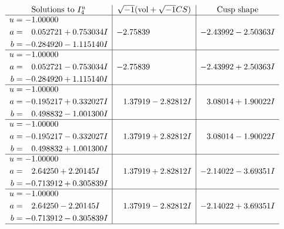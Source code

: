 \documentclass[1p]{elsarticle_modified}
\theoremstyle{definition}
\newcommand{\I}{\sqrt{-1}}
\begin{document}
$$\begin{array}{c|c|c}  
\text{Solutions to }I^u_{4}& \I (\text{vol} + \sqrt{-1}CS) & \text{Cusp shape}\\
 \hline 
\begin{aligned}
u &= -1.00000\phantom{ +0.000000I} \\
a &= \phantom{-}0.052721 + 0.753034 I \\
b &= -0.284920 - 1.115140 I\end{aligned}
 & -2.75839\phantom{ +0.000000I} & -2.43992 - 2.50363 I \\ \hline\begin{aligned}
u &= -1.00000\phantom{ +0.000000I} \\
a &= \phantom{-}0.052721 - 0.753034 I \\
b &= -0.284920 + 1.115140 I\end{aligned}
 & -2.75839\phantom{ +0.000000I} & -2.43992 + 2.50363 I \\ \hline\begin{aligned}
u &= -1.00000\phantom{ +0.000000I} \\
a &= -0.195217 + 0.332027 I \\
b &= \phantom{-}0.498832 - 1.001300 I\end{aligned}
 & \phantom{-}1.37919 - 2.82812 I & \phantom{-}3.08014 + 1.90022 I \\ \hline\begin{aligned}
u &= -1.00000\phantom{ +0.000000I} \\
a &= -0.195217 - 0.332027 I \\
b &= \phantom{-}0.498832 + 1.001300 I\end{aligned}
 & \phantom{-}1.37919 + 2.82812 I & \phantom{-}3.08014 - 1.90022 I \\ \hline\begin{aligned}
u &= -1.00000\phantom{ +0.000000I} \\
a &= \phantom{-}2.64250 + 2.20145 I \\
b &= -0.713912 + 0.305839 I\end{aligned}
 & \phantom{-}1.37919 + 2.82812 I & -2.14022 - 3.69351 I \\ \hline\begin{aligned}
u &= -1.00000\phantom{ +0.000000I} \\
a &= \phantom{-}2.64250 - 2.20145 I \\
b &= -0.713912 - 0.305839 I\end{aligned}
 & \phantom{-}1.37919 - 2.82812 I & -2.14022 + 3.69351 I\\
 \hline 
 \end{array}$$\newpage
\end{document}
